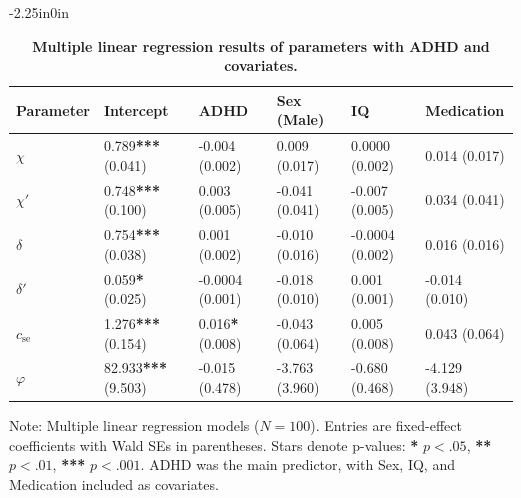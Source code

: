 \begin{table}[H]
\begin{adjustwidth}{-2.25in}{0in} %
\centering
\caption{\textbf{Multiple linear regression results of parameters with ADHD and covariates.}}
\begin{tabularx}{\linewidth}{lXXXXX}
\toprule
\textbf{Parameter} & \textbf{Intercept} & \textbf{ADHD} & \textbf{Sex (Male)} & \textbf{IQ} & \textbf{Medication} \\
\midrule
$\chi$ & 0.789\textbf{***} (0.041) & -0.004 (0.002) & 0.009 (0.017) & 0.0000 (0.002) & 0.014 (0.017) \\
$\chi'$ & 0.748\textbf{***} (0.100) & 0.003 (0.005) & -0.041 (0.041) & -0.007 (0.005) & 0.034 (0.041) \\
$\delta$ & 0.754\textbf{***} (0.038) & 0.001 (0.002) & -0.010 (0.016) & -0.0004 (0.002) & 0.016 (0.016) \\
$\delta'$ & 0.059\textbf{*} (0.025) & -0.0004 (0.001) & -0.018 (0.010) & 0.001 (0.001) & -0.014 (0.010) \\
$c_{\mathrm{se}}$ & 1.276\textbf{***} (0.154) & 0.016\textbf{*} (0.008) & -0.043 (0.064) & 0.005 (0.008) & 0.043 (0.064) \\
$\varphi$ & 82.933\textbf{***} (9.503) & -0.015 (0.478) & -3.763 (3.960) & -0.680 (0.468) & -4.129 (3.948) \\
\bottomrule
\end{tabularx}
\begin{flushleft} Note: Multiple linear regression models ($N=100$). Entries are fixed-effect coefficients with Wald SEs in parentheses. Stars denote p-values: \textbf{*} $p<.05$, \textbf{**} $p<.01$, \textbf{***} $p<.001$. ADHD was the main predictor, with Sex, IQ, and Medication included as covariates.
\end{flushleft}
\label{tab:lm_pomdp}
\end{adjustwidth}
\end{table}